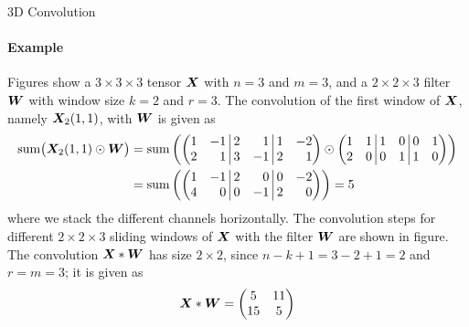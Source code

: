 %
\begin{frame}{3D Convolution}
\framesubtitle{Example}
Figures show a $3 \times 3 \times 3$ tensor 
    ${\boldsymbol X}$ with $n=3$ and $m=3$, and a $2 \times 2 \times 3$
    filter ${\boldsymbol W}$ with window size $k=2$ and $r=3$. The convolution of the 
    first window of ${\boldsymbol X}$, namely ${\boldsymbol X}_2(1,1)$, with ${\boldsymbol W}$
    is given as%
    \begin{align*}
        \summ\bigl(\bX_2(1,1) \odot \bW\bigr) & = 
        \summ\lB(
            \amatr{r}{1 & -1 \;\vline\; 2 & 1\;\vline\; 1 & -2\\
                  2 & 1 \;\vline\; 3 & -1\;\vline\; 2 & 1} 
                  \odot 
                  \matr{1 & 1 \;\vline\; 1 & 0\;\vline\; 0 & 1\\
                        2 & 0 \;\vline\; 0 & 1\;\vline\;1 & 0}
        \rB)\\
        & = \summ\lB( 
            \amatr{r}{1 & -1 \;\vline\; 2 & 0\;\vline\; 0 & -2\\
                        4 & 0 \;\vline\; 0 & -1\;\vline\;2 & 0}
    \rB)  = 5
    \end{align*}
    where we stack the different channels horizontally.
    The convolution steps for different $2\times 2 \times 3$ 
    sliding windows of ${\boldsymbol X}$ with the
    filter ${\boldsymbol W}$ are shown in figure.
    The convolution ${\boldsymbol X} \ast {\boldsymbol W}$ has size $2 \times 2$, since 
    $n-k+1 = 3-2+1 = 2$ and $r=m=3$; it is
    given as 
    \begin{align*}
        {\boldsymbol X} \ast {\boldsymbol W} = \begin{pmatrix} 5 &11\\
            15 & 5
         \end{pmatrix}
    \end{align*}
\end{frame}
